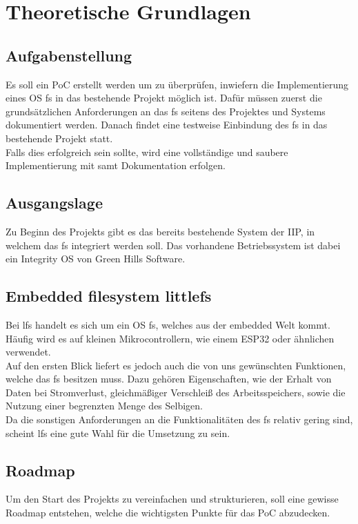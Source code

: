 
\section{Theoretische Grundlagen}\label{section:theoretische_grundlagen}

\subsection{Aufgabenstellung}
Es soll ein \acl{PoC} erstellt werden um zu überprüfen, inwiefern die Implementierung eines
\acl{OS} \acl{fs} in das bestehende Projekt möglich ist.
Dafür müssen zuerst die grundsätzlichen Anforderungen an das \acl{fs} seitens des Projektes und Systems dokumentiert werden.
Danach findet eine testweise Einbindung des \acl{fs} in das bestehende Projekt statt.\\

Falls dies erfolgreich sein sollte, wird eine vollständige und saubere Implementierung mit samt
Dokumentation erfolgen.


\subsection{Ausgangslage}
Zu Beginn des Projekts gibt es das bereits bestehende System der \acl{IIP}, in welchem das \acl{fs} integriert werden soll.
Das vorhandene Betriebssystem ist dabei ein Integrity OS von Green Hills Software.


\subsection{Embedded filesystem littlefs}
Bei \acl{lfs} handelt es sich um ein \acl{OS} \acl{fs}, welches aus der embedded Welt kommt.
Häufig wird es auf kleinen Mikrocontrollern, wie einem ESP32 oder ähnlichen verwendet.\\

Auf den ersten Blick liefert es jedoch auch die von uns gewünschten Funktionen, welche das \acl{fs} besitzen muss.
Dazu gehören Eigenschaften, wie der Erhalt von Daten bei Stromverlust, gleichmäßiger Verschleiß des Arbeitsspeichers, sowie die Nutzung einer begrenzten Menge des Selbigen.\\

Da die sonstigen Anforderungen an die Funktionalitäten des \acl{fs} relativ gering sind,
scheint \acl{lfs} eine gute Wahl für die Umsetzung zu sein.


\subsection{Roadmap}\label{sec:roadmap}
Um den Start des Projekts zu vereinfachen und strukturieren, soll eine gewisse Roadmap entstehen,
welche die wichtigsten Punkte für das \acl{PoC} abzudecken.


